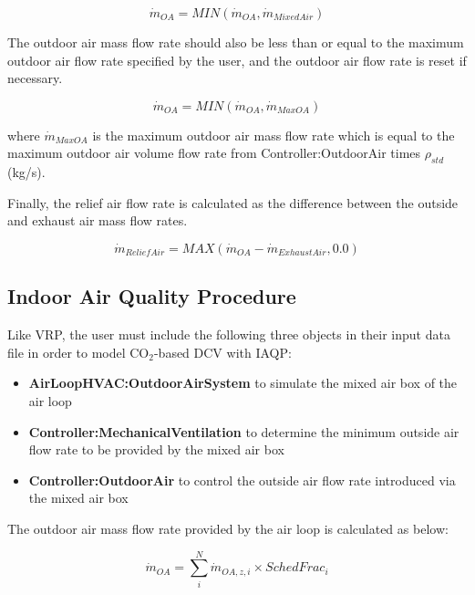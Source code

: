 \begin{equation}
{\dot m_{OA}} = MIN\left( {{{\dot m}_{OA}},{{\dot m}_{MixedAir}}} \right)
\end{equation}

The outdoor air mass flow rate should also be less than or equal to the maximum outdoor air flow rate specified by the user, and the outdoor air flow rate is reset if necessary.

\begin{equation}
{\dot m_{OA}} = MIN\left( {{{\dot m}_{OA}},{{\dot m}_{MaxOA}}} \right)
\end{equation}

where \({\dot m_{MaxOA}}\) is the maximum outdoor air mass flow rate which is equal to the maximum outdoor air volume flow rate from Controller:OutdoorAir times \({\rho_{std}}\) (kg/s).

Finally, the relief air flow rate is calculated as the difference between the outside and exhaust air mass flow rates.

\begin{equation}
{\dot m_{ReliefAir}} = MAX\left( {{{\dot m}_{OA}} - {{\dot m}_{ExhaustAir}},0.0} \right)
\end{equation}

\subsection{Indoor Air Quality Procedure}\label{indoor-air-quality-procedure}

Like VRP, the user must include the following three objects in their input data file in order to model CO\(_{2}\)-based DCV with IAQP:

\begin{itemize}
  \item \textbf{AirLoopHVAC:OutdoorAirSystem} to simulate the mixed air box of the air loop
  \item \textbf{Controller:MechanicalVentilation} to determine the minimum outside air flow rate to be provided by the mixed air box
  \item \textbf{Controller:OutdoorAir} to control the outside air flow rate introduced via the mixed air box
\end{itemize}

The outdoor air mass flow rate provided by the air loop is calculated as below:

\begin{equation}
{\dot m_{OA}} = \sum\limits_i^N {{{\dot m}_{OA,z,i}} \times {SchedFrac_i}}
\end{equation}

